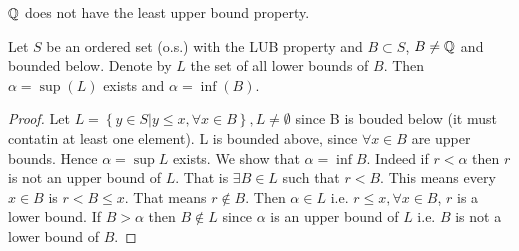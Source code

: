 \begin{example}
	\( \mathbb{Q} \) does not have the least upper bound property.
\end{example}

\begin{theorem}
	Let \( S \) be an ordered set (o.s.) with the LUB property and \( B \subset S \), 
	\( B \not = \mathbb{Q} \) and bounded below. Denote by \( L \) the set of all lower bounds of \(
	B \). Then \( \alpha = \sup(L) \) exists and \( \alpha = \inf(B) \).
	\label{Theorem1}
\end{theorem}

\begin{proof}
	Let \( L = \left\{ y \in S | y \le x, \forall x \in B \right\}, L \not = \emptyset \) since
	B is bouded below (it must contatin at least one element). L is bounded above, since \(
	\forall x \in B \) are upper bounds. 
	Hence \( \alpha = \sup L \) exists. 
	We show that \( \alpha = \inf B \). 
	Indeed if \( r < \alpha \) then \( r \) is not an upper bound of \( L \). 
	That is \( \exists B \in L \) such that \( r < B \). This means every \( x \in B \) is 
	\( r < B \le x \). That means \( r \not \in B \).
	Then \( \alpha \in L \) i.e. \( r \le x, \forall x \in B  \), \( r \) is a lower bound. 
	If \( B > \alpha \) then \( B \not \in L \) since \( \alpha \) is an upper bound of \( L
	\) i.e. \( B \) is not a lower bound of \( B \). 
\end{proof} 

